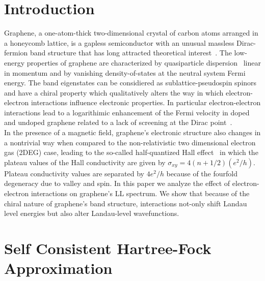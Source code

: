 \documentclass{ws-ijmpb}
\begin{document}

\section{Introduction}

Graphene, a one-atom-thick two-dimensional crystal of carbon atoms arranged 
in a honeycomb lattice, is a gapless semiconductor with an unusual massless 
Dirac-fermion band structure that has long attracted theoretical 
interest~\cite{semenoff,haldane}. The  
low-energy properties of graphene are characterized by 
quasiparticle dispersion~\cite{earlyguy} linear in momentum and by 
vanishing density-of-states at the neutral system Fermi energy.
The band eigenstates can be considiered as sublattice-pseudospin 
spinors and have a chiral property which 
qualitatively alters the way in which electron-electron interactions influence 
electronic  properties. In particular electron-electron interactions lead to a
logarithimic enhancement of the Fermi velocity in doped and undoped graphene
related to a lack of screening at the Dirac 
point~\cite{gin,polinissc,vafek}.\\ 
In the presence of a magnetic field, graphene's electronic 
structure  also changes in a nontrivial way when compared to the non-relativistic 
two dimensional electron 
gas (2DEG) case, leading to the so-called half-quantized Hall effect~\cite{qhtheory,qhexpt}
in which the plateau values of the  
Hall conductivity are given by $\sigma_{xy} = 4(n+1/2)(e^{2}/h)$.
Plateau conductivity values are separated 
by $4e^{2}/h$ because of the fourfold degeneracy due to valley and spin. In this paper we analyze the effect 
of electron-electron interactions on graphene's LL spectrum.  We show that because of the 
chiral nature of graphene's band structure, interactions not-only shift Landau level
energies but also alter Landau-level wavefunctions. 

\section{Self Consistent Hartree-Fock Approximation}
\end{document}
